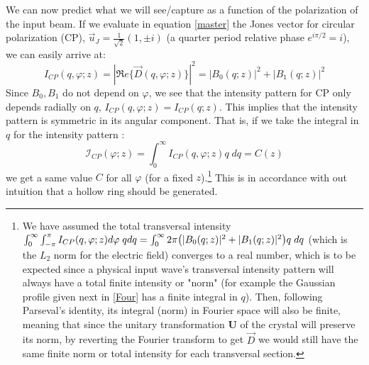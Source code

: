 \documentclass[11pt, a4paper, twoside]{article} %
\begin{document}
We can now predict what we will see/capture as a function of the polarization of the input beam. If we evaluate in equation \eqref{master} the Jones vector for circular polarization (CP), $\vec{u}_J=\frac{1}{\sqrt{2}}(1,\pm i)$ (a quarter period relative phase $e^{i\pi/2}=i$), we can easily arrive at:
\begin{equation}
I_{CP}(q,\varphi;z)=|\mathfrak{R}e\{\vec{D}(q,\varphi;z)\}|^2=|B_0(q;z)|^2+|B_1(q;z)|^2
\end{equation}
Since $B_0,B_1$ do not depend on $\varphi$, we see that the intensity pattern for CP only depends radially on $q$, $I_{CP}(q,\varphi;z)=I_{CP}(q;z)$. This implies that the intensity pattern is symmetric in its angular component. That is, if we take the integral in $q$ for the intensity pattern :
\begin{equation}\label{yoyo}
\mathcal{I}_{CP}(\varphi;z)=\int_0^\infty I_{CP}(q,\varphi;z)q\;dq=C(z)
\end{equation}
we get a same value $C$ for all $\varphi$ (for a fixed $z$).\footnote{We have assumed the total transversal intensity $\int_0^\infty \int_{-\pi}^{\pi}I_{CP}(q,\varphi;z)d\varphi\;qdq=\int_0^\infty2\pi\qty(|B_0(q;z)|^2+|B_1(q;z)|^2)q\;dq$ (which is the $L_2$ norm for the electric field) converges to a real number, which is to be expected since a physical input wave's transversal intensity pattern will always have a total finite intensity or "norm" (for example the Gaussian profile given next in \eqref{Four} has a finite integral in $q$). Then, following Parseval's identity, its integral (norm) in Fourier space will also be finite, meaning that since the unitary transformation $\pmb{U}$ of the crystal will preserve its norm, by reverting the Fourier transform to get $\vec{D}$ we would still have the same finite norm or total intensity for each transversal section.  } This is in accordance with out intuition that a hollow ring should be generated.
\end{document}
